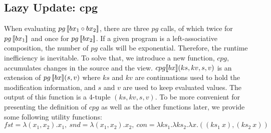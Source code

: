 \subsection{Lazy Update: cpg} 

When evaluating $pg \, [\![bx_1 \circ bx_2]\!]$, there are three $pg$ calls, of which twice for $pg \, [\![bx_1]\!]$ and once for $pg \, [\![bx_2]\!]$. If a given program is a left-associative composition, the number of $pg$ calls will be exponential. Therefore, the runtime inefficiency is inevitable. To solve that, we introduce a new function, $cpg$, accumulates changes in the source and the view. $cpg [\![bx]\!] (ks, kv, s, v)$ is an extension of $pg \, [\![bx]\!] (s, v)$ where $ks$ and $kv$ are continuations used to hold the modification information, and $s$ and $v$ are used to keep evaluated values. The output of this function is a 4-tuple $(ks, kv, s, v)$. To be more convenient for presenting the definition of $cpg$ as well as the other functions later, we provide some following utility functions:\\ $fst = \lambda (x_1,x_2). x_1 , \ snd = \lambda (x_1,x_2). x_2 , \ con = \lambda ks_1. \lambda ks_2. \lambda x. ((ks_1 \ x),(ks_2 \ x))$

